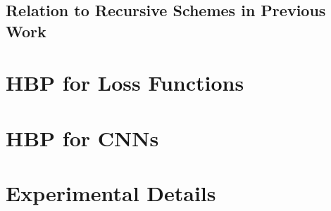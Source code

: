 \subsection{Relation to Recursive Schemes in Previous Work}\label{hbp::subsec:relation}


\section{HBP for Loss Functions}\label{hbp::sec:examples_loss}


\section{HBP for CNNs}\label{hbp::sec:examples_cnn}


\section{Experimental Details}\label{hbp::sec:experimentalDetails}


